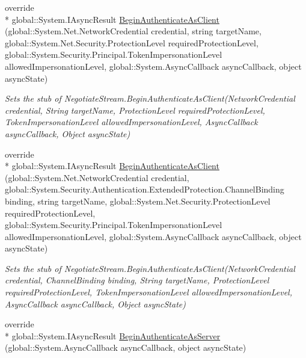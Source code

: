 \begin{DoxyCompactItemize}
override \\*
global\-::\-System.\-I\-Async\-Result \hyperlink{class_system_1_1_net_1_1_security_1_1_fakes_1_1_stub_negotiate_stream_a9d64bbd6ee026565ec92c0f4c1c2e865}{Begin\-Authenticate\-As\-Client} (global\-::\-System.\-Net.\-Network\-Credential credential, string target\-Name, global\-::\-System.\-Net.\-Security.\-Protection\-Level required\-Protection\-Level, global\-::\-System.\-Security.\-Principal.\-Token\-Impersonation\-Level allowed\-Impersonation\-Level, global\-::\-System.\-Async\-Callback async\-Callback, object async\-State)
\begin{DoxyCompactList}\small\item\em Sets the stub of Negotiate\-Stream.\-Begin\-Authenticate\-As\-Client(\-Network\-Credential credential, String target\-Name, Protection\-Level required\-Protection\-Level, Token\-Impersonation\-Level allowed\-Impersonation\-Level, Async\-Callback async\-Callback, Object async\-State)\end{DoxyCompactList}\item 
override \\*
global\-::\-System.\-I\-Async\-Result \hyperlink{class_system_1_1_net_1_1_security_1_1_fakes_1_1_stub_negotiate_stream_a65e02a19816f6bbdb6f83c0990631e1c}{Begin\-Authenticate\-As\-Client} (global\-::\-System.\-Net.\-Network\-Credential credential, global\-::\-System.\-Security.\-Authentication.\-Extended\-Protection.\-Channel\-Binding binding, string target\-Name, global\-::\-System.\-Net.\-Security.\-Protection\-Level required\-Protection\-Level, global\-::\-System.\-Security.\-Principal.\-Token\-Impersonation\-Level allowed\-Impersonation\-Level, global\-::\-System.\-Async\-Callback async\-Callback, object async\-State)
\begin{DoxyCompactList}\small\item\em Sets the stub of Negotiate\-Stream.\-Begin\-Authenticate\-As\-Client(\-Network\-Credential credential, Channel\-Binding binding, String target\-Name, Protection\-Level required\-Protection\-Level, Token\-Impersonation\-Level allowed\-Impersonation\-Level, Async\-Callback async\-Callback, Object async\-State)\end{DoxyCompactList}\item 
override \\*
global\-::\-System.\-I\-Async\-Result \hyperlink{class_system_1_1_net_1_1_security_1_1_fakes_1_1_stub_negotiate_stream_ae27b0850bce03d2a66adbfc6e42d995b}{Begin\-Authenticate\-As\-Server} (global\-::\-System.\-Async\-Callback async\-Callback, object async\-State)

\end{DoxyCompactItemize}
